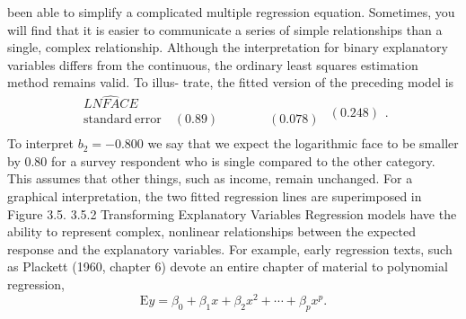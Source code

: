 \documentclass[11pt]{article}
\begin{document}
been able to simplify a complicated multiple regression equation. Sometimes,
 you will find that it is easier to communicate a series of simple relationships than
a single, complex relationship.
 Although the interpretation for binary explanatory variables differs from the
continuous, the ordinary least squares estimation method remains valid. To illus-
trate, the fitted version of the preceding model is
\[
\begin{array} {l} {\widehat{L N F A C E}} \\ {\mathrm{s t a n d a r d ~ e r r o r} \quad( 0 . 8 9 ) \qquad\qquad( 0 . 0 7 8 )} \\ \end{array} \begin{array} {l} {{\mathrm{~}}} \\ {( 0 . 2 4 8 )} \\ \end{array} .
\]
 To interpret \(b_{2}=-0 . 8 0 0\) we say that we expect the logarithmic face to be smaller
 by 0.80 for a survey respondent who is single compared to the other category. This
assumes that other things, such as income, remain unchanged. For a graphical
interpretation, the two fitted regression lines are superimposed in Figure 3.5.
3.5.2 Transforming Explanatory Variables
Regression models have the ability to represent complex, nonlinear relationships
 between the expected response and the explanatory variables. For example, early
regression texts, such as Plackett (1960, chapter 6) devote an entire chapter of
 material to polynomial regression,
\[
\textrm{E} y=\beta_{0}+\beta_{1} x+\beta_{2} x^{2}+\cdots+\beta_{p} x^{p} . \tag{3.12}
\]
\end{document}
